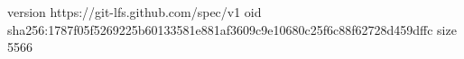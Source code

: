 version https://git-lfs.github.com/spec/v1
oid sha256:1787f05f5269225b60133581e881af3609c9e10680c25f6c88f62728d459dffc
size 5566
